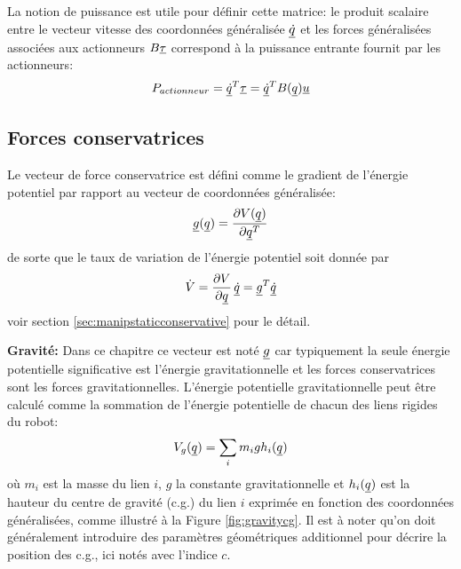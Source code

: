 La notion de puissance est utile pour définir cette matrice: le produit scalaire entre le vecteur vitesse des coordonnées généralisée $\underline{\dot{q}}$ et les forces généralisées associées aux actionneurs $B\underline{\tau}$ correspond à la puissance entrante fournit par les actionneurs:
\begin{align}
P_{actionneur} = \underline{\dot{q}}^T \underline{\tau} = \underline{\dot{q}}^T B(\underline{q}) \underline{u}
\end{align}


\subsection{Forces conservatrices}

Le vecteur de force conservatrice est défini comme le gradient de l'énergie potentiel par rapport au vecteur de coordonnées généralisée:
\begin{align}
 \underline{g} ( \underline{q} ) = 
\frac{ \partial V(\underline{q} ) }{\partial \underline{q}^T } 
\end{align}
de sorte que le taux de variation de l'énergie potentiel soit donnée par
\begin{align}
\dot{V} = \frac{\partial V}{ \partial \underline{q}} \, \underline{\dot{q}} =  \underline{g}^T \underline{\dot{q}}
\end{align}
voir section \ref{sec:manipstaticconservative} pour le détail. 


\textbf{Gravité:} Dans ce chapitre ce vecteur est noté $\underline{g}$ car typiquement la seule énergie potentielle significative est l'énergie gravitationnelle et les forces conservatrices sont les forces gravitationnelles. L'énergie potentielle gravitationnelle peut être calculé comme la sommation de l'énergie potentielle de chacun des liens rigides du robot:
\begin{align}
V_g(\underline{q}) = \sum_i m_i g h_i(\underline{q})
\end{align}
où $m_i$ est la masse du lien $i$, $g$ la constante gravitationnelle et $h_i(\underline{q})$ est la hauteur du centre de gravité (c.g.) du lien $i$ exprimée en fonction des coordonnées généralisées, comme illustré à la Figure \ref{fig:gravitycg}. Il est à noter qu'on doit généralement introduire des paramètres géométriques additionnel pour décrire la position des c.g., ici notés avec l'indice $c$.

